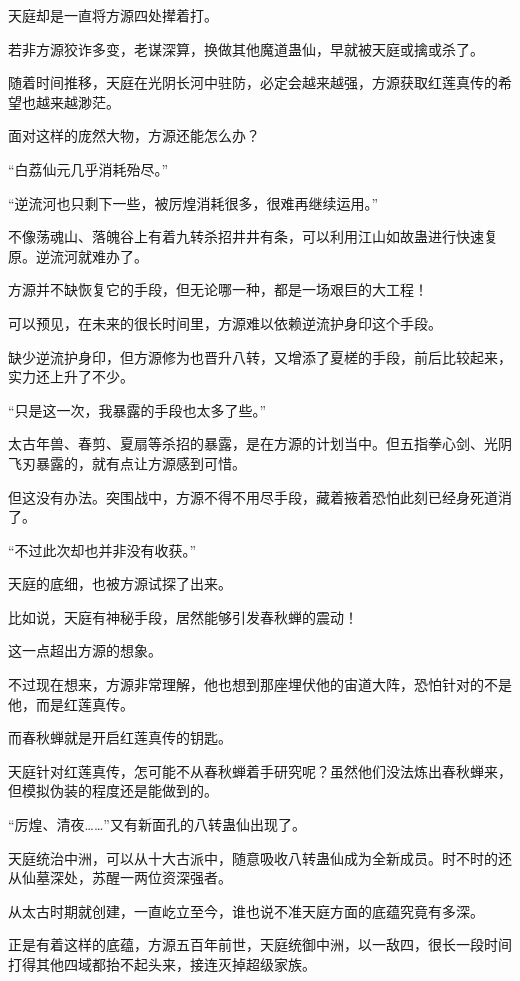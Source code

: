 \begin{this_body}
天庭却是一直将方源四处撵着打。

若非方源狡诈多变，老谋深算，换做其他魔道蛊仙，早就被天庭或擒或杀了。

随着时间推移，天庭在光阴长河中驻防，必定会越来越强，方源获取红莲真传的希望也越来越渺茫。

面对这样的庞然大物，方源还能怎么办？

“白荔仙元几乎消耗殆尽。”

“逆流河也只剩下一些，被厉煌消耗很多，很难再继续运用。”

不像荡魂山、落魄谷上有着九转杀招井井有条，可以利用江山如故蛊进行快速复原。逆流河就难办了。

方源并不缺恢复它的手段，但无论哪一种，都是一场艰巨的大工程！

可以预见，在未来的很长时间里，方源难以依赖逆流护身印这个手段。

缺少逆流护身印，但方源修为也晋升八转，又增添了夏槎的手段，前后比较起来，实力还上升了不少。

“只是这一次，我暴露的手段也太多了些。”

太古年兽、春剪、夏扇等杀招的暴露，是在方源的计划当中。但五指拳心剑、光阴飞刃暴露的，就有点让方源感到可惜。

但这没有办法。突围战中，方源不得不用尽手段，藏着掖着恐怕此刻已经身死道消了。

“不过此次却也并非没有收获。”

天庭的底细，也被方源试探了出来。

比如说，天庭有神秘手段，居然能够引发春秋蝉的震动！

这一点超出方源的想象。

不过现在想来，方源非常理解，他也想到那座埋伏他的宙道大阵，恐怕针对的不是他，而是红莲真传。

而春秋蝉就是开启红莲真传的钥匙。

天庭针对红莲真传，怎可能不从春秋蝉着手研究呢？虽然他们没法炼出春秋蝉来，但模拟伪装的程度还是能做到的。

“厉煌、清夜……”又有新面孔的八转蛊仙出现了。

天庭统治中洲，可以从十大古派中，随意吸收八转蛊仙成为全新成员。时不时的还从仙墓深处，苏醒一两位资深强者。

从太古时期就创建，一直屹立至今，谁也说不准天庭方面的底蕴究竟有多深。

正是有着这样的底蕴，方源五百年前世，天庭统御中洲，以一敌四，很长一段时间打得其他四域都抬不起头来，接连灭掉超级家族。


\end{this_body}
